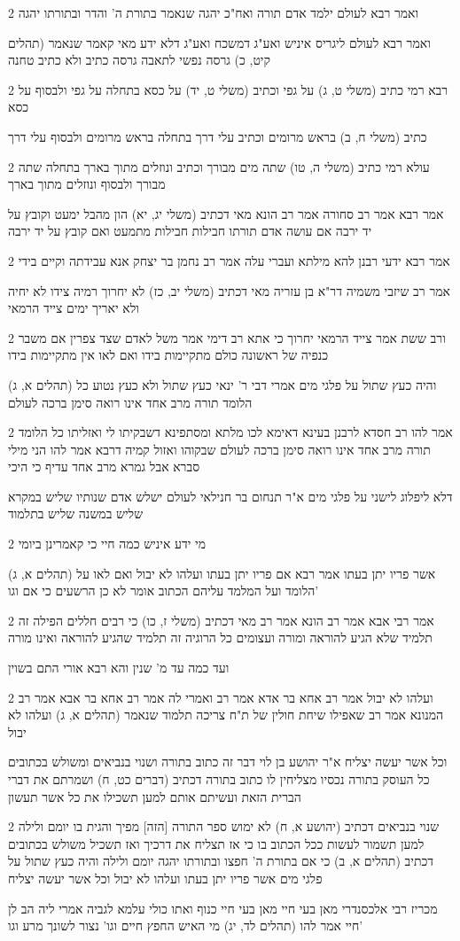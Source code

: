 \documentclass[12pt, openany]{book}
\newcommand{\sethebfont}{
\fontsize{10.5pt}{21.0pt} \selectfont
}
\newcommand{\twocol}[1]{
	{\sethebfont \begin{multicols}{2}
			#1
	\end{multicols}}	
}
\begin{document}
\twocol{ואמר רבא לעולם ילמד אדם תורה ואח"כ יהגה שנאמר בתורת ה' והדר ובתורתו יהגה
\par ואמר רבא לעולם ליגריס איניש ואע"ג דמשכח ואע"ג דלא ידע מאי קאמר שנאמר (תהלים קיט, כ) גרסה נפשי לתאבה גרסה כתיב ולא כתיב טחנה}
\twocol{רבא רמי כתיב (משלי ט, ג) על גפי וכתיב (משלי ט, יד) על כסא בתחלה על גפי ולבסוף על כסא
\par כתיב (משלי ח, ב) בראש מרומים וכתיב עלי דרך בתחלה בראש מרומים ולבסוף עלי דרך}
\twocol{עולא רמי כתיב (משלי ה, טו) שתה מים מבורך וכתיב ונוזלים מתוך בארך בתחלה שתה מבורך ולבסוף ונוזלים מתוך בארך
\par אמר רבא אמר רב סחורה אמר רב הונא מאי דכתיב (משלי יג, יא) הון מהבל ימעט וקובץ על יד ירבה אם עושה אדם תורתו חבילות חבילות מתמעט ואם קובץ על יד ירבה}
\twocol{אמר רבא ידעי רבנן להא מילתא ועברי עלה אמר רב נחמן בר יצחק אנא עבידתה וקיים בידי
\par אמר רב שיזבי משמיה דר"א בן עזריה מאי דכתיב (משלי יב, כז) לא יחרוך רמיה צידו לא יחיה ולא יאריך ימים צייד הרמאי}
\twocol{ורב ששת אמר צייד הרמאי יחרוך כי אתא רב דימי אמר משל לאדם שצד צפרין אם משבר כנפיה של ראשונה כולם מתקיימות בידו ואם לאו אין מתקיימות בידו
\par (תהלים א, ג) והיה כעץ שתול על פלגי מים אמרי דבי ר' ינאי כעץ שתול ולא כעץ נטוע כל הלומד תורה מרב אחד אינו רואה סימן ברכה לעולם}
\twocol{ אמר להו רב חסדא לרבנן בעינא דאימא לכו מלתא ומסתפינא דשבקיתו לי ואזליתו כל הלומד תורה מרב אחד אינו רואה סימן ברכה לעולם שבקוהו ואזול קמיה דרבא אמר להו הני מילי סברא אבל גמרא מרב אחד עדיף כי היכי
\par דלא ליפלוג לישני על פלגי מים א"ר תנחום בר חנילאי לעולם ישלש אדם שנותיו שליש במקרא שליש במשנה שליש בתלמוד}
\twocol{מי ידע איניש כמה חיי כי קאמרינן ביומי
\par (תהלים א, ג) אשר פריו יתן בעתו אמר רבא אם פריו יתן בעתו ועלהו לא יבול ואם לאו על הלומד ועל המלמד עליהם הכתוב אומר לא כן הרשעים כי אם וגו'}
\twocol{אמר רבי אבא אמר רב הונא אמר רב מאי דכתיב (משלי ז, כו) כי רבים חללים הפילה זה תלמיד שלא הגיע להוראה ומורה ועצומים כל הרוגיה זה תלמיד שהגיע להוראה ואינו מורה
\par ועד כמה עד מ' שנין והא רבא אורי התם בשוין}
\twocol{ועלהו לא יבול אמר רב אחא בר אדא אמר רב ואמרי לה אמר רב אחא בר אבא אמר רב המנונא אמר רב שאפילו שיחת חולין של ת"ח צריכה תלמוד שנאמר (תהלים א, ג) ועלהו לא יבול
\par וכל אשר יעשה יצליח א"ר יהושע בן לוי דבר זה כתוב בתורה ושנוי בנביאים ומשולש בכתובים כל העוסק בתורה נכסיו מצליחין לו כתוב בתורה דכתיב (דברים כט, ח) ושמרתם את דברי הברית הזאת ועשיתם אותם למען תשכילו את כל אשר תעשון}
\twocol{שנוי בנביאים דכתיב (יהושע א, ח) לא ימוש ספר התורה [הזה] מפיך והגית בו יומם ולילה למען תשמור לעשות ככל הכתוב בו כי אז תצליח את דרכיך ואז תשכיל משולש בכתובים דכתיב (תהלים א, ב) כי אם בתורת ה' חפצו ובתורתו יהגה יומם ולילה והיה כעץ שתול על פלגי מים אשר פריו יתן בעתו ועלהו לא יבול וכל אשר יעשה יצליח
\par מכריז רבי אלכסנדרי מאן בעי חיי מאן בעי חיי כנוף ואתו כולי עלמא לגביה אמרי ליה הב לן חיי אמר להו (תהלים לד, יג) מי האיש החפץ חיים וגו' נצור לשונך מרע וגו'}
\end{document}
